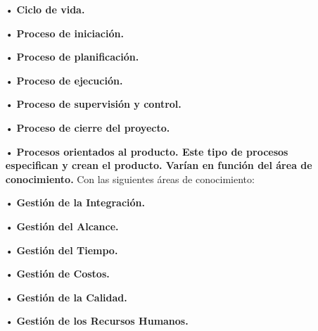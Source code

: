 \begin{itemize}
\item[•] \textbf{Ciclo de vida.}
\item[•] \textbf{Proceso de iniciación.}
\item[•] \textbf{Proceso de planificación.}
\item[•] \textbf{Proceso de ejecución.}
\item[•] \textbf{Proceso de supervisión y control.}
\item[•] \textbf{Proceso de cierre del proyecto.}
\item[•] \textbf{Procesos orientados al producto. Este tipo de procesos especifican y crean el producto. Varían en función del área de conocimiento.}
Con las siguientes áreas de conocimiento:

\item[•] \textbf{Gestión de la Integración.}
\item[•] \textbf{Gestión del Alcance.}
\item[•] \textbf{Gestión del Tiempo.}
\item[•] \textbf{Gestión de Costos.}
\item[•] \textbf{Gestión de la Calidad.}
\item[•] \textbf{Gestión de los Recursos Humanos.}
\end{itemize}
